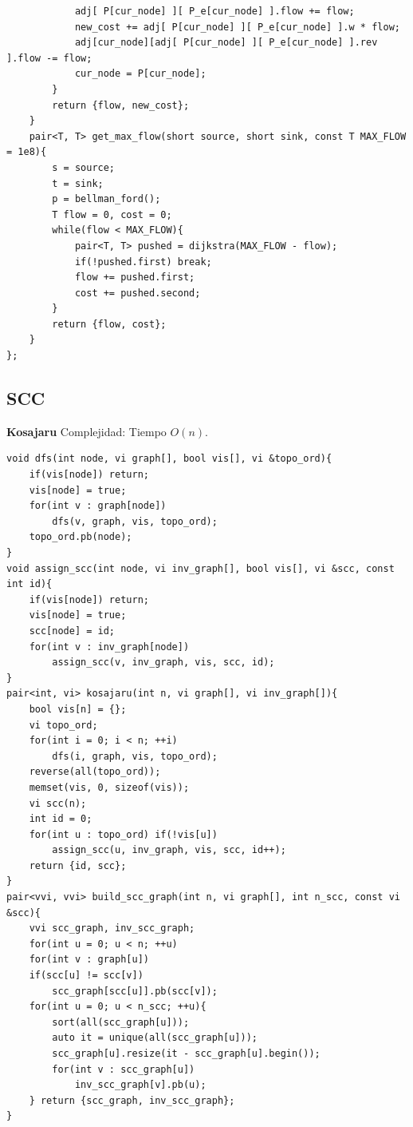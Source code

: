 \documentclass[10pt,spanish,mexico]{article}
\numberwithin{equation}{section}
\begin{document}
\begin{multicols}{2}
\begin{verbatim}
            adj[ P[cur_node] ][ P_e[cur_node] ].flow += flow;
            new_cost += adj[ P[cur_node] ][ P_e[cur_node] ].w * flow;
            adj[cur_node][adj[ P[cur_node] ][ P_e[cur_node] ].rev ].flow -= flow;
            cur_node = P[cur_node];
        }
        return {flow, new_cost};
    }
    pair<T, T> get_max_flow(short source, short sink, const T MAX_FLOW = 1e8){
        s = source;
        t = sink;
        p = bellman_ford();
        T flow = 0, cost = 0;
        while(flow < MAX_FLOW){
            pair<T, T> pushed = dijkstra(MAX_FLOW - flow);
            if(!pushed.first) break;
            flow += pushed.first;
            cost += pushed.second;
        }
        return {flow, cost};
    }
};
\end{verbatim}

\vspace{-1.2\baselineskip}
\hrulefill
\subsection{SCC}
\textbf{Kosajaru}
Complejidad: Tiempo $O(n)$.
\begin{verbatim}
void dfs(int node, vi graph[], bool vis[], vi &topo_ord){
    if(vis[node]) return;
    vis[node] = true;
    for(int v : graph[node])
        dfs(v, graph, vis, topo_ord);
    topo_ord.pb(node);
}
void assign_scc(int node, vi inv_graph[], bool vis[], vi &scc, const int id){
    if(vis[node]) return;
    vis[node] = true;
    scc[node] = id;
    for(int v : inv_graph[node])
        assign_scc(v, inv_graph, vis, scc, id);
}
pair<int, vi> kosajaru(int n, vi graph[], vi inv_graph[]){
    bool vis[n] = {};
    vi topo_ord;
    for(int i = 0; i < n; ++i)
        dfs(i, graph, vis, topo_ord);
    reverse(all(topo_ord));
    memset(vis, 0, sizeof(vis));
    vi scc(n);
    int id = 0;
    for(int u : topo_ord) if(!vis[u])
        assign_scc(u, inv_graph, vis, scc, id++);
    return {id, scc};
}
pair<vvi, vvi> build_scc_graph(int n, vi graph[], int n_scc, const vi &scc){
    vvi scc_graph, inv_scc_graph;
    for(int u = 0; u < n; ++u)
    for(int v : graph[u])
    if(scc[u] != scc[v])
        scc_graph[scc[u]].pb(scc[v]);
    for(int u = 0; u < n_scc; ++u){
        sort(all(scc_graph[u]));
        auto it = unique(all(scc_graph[u]));
        scc_graph[u].resize(it - scc_graph[u].begin());
        for(int v : scc_graph[u])
            inv_scc_graph[v].pb(u);
    } return {scc_graph, inv_scc_graph};
}
\end{verbatim}

\vspace{-1.2\baselineskip}
\hrulefill

\end{multicols}
\end{document}
